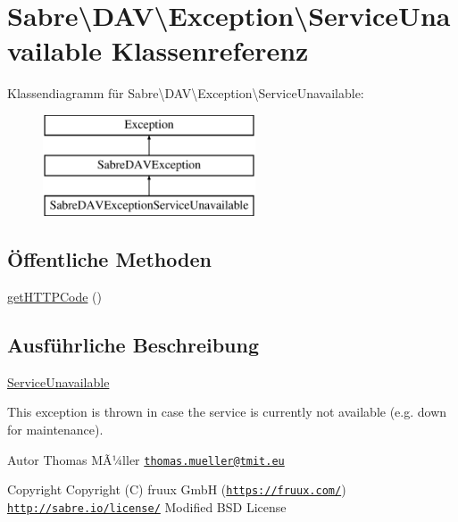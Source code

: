 \hypertarget{class_sabre_1_1_d_a_v_1_1_exception_1_1_service_unavailable}{}\section{Sabre\textbackslash{}D\+AV\textbackslash{}Exception\textbackslash{}Service\+Unavailable Klassenreferenz}
\label{class_sabre_1_1_d_a_v_1_1_exception_1_1_service_unavailable}
Klassendiagramm für Sabre\textbackslash{}D\+AV\textbackslash{}Exception\textbackslash{}Service\+Unavailable\+:\begin{figure}[H]
\begin{center}
\leavevmode
\includegraphics[height=3.000000cm]{class_sabre_1_1_d_a_v_1_1_exception_1_1_service_unavailable}
\end{center}
\end{figure}
\subsection*{Öffentliche Methoden}
\begin{DoxyCompactItemize}
\item 
\mbox{\hyperlink{class_sabre_1_1_d_a_v_1_1_exception_1_1_service_unavailable_ae8c3c16f888a0fec458229e94f56d614}{get\+H\+T\+T\+P\+Code}} ()
\end{DoxyCompactItemize}


\subsection{Ausführliche Beschreibung}
\mbox{\hyperlink{class_sabre_1_1_d_a_v_1_1_exception_1_1_service_unavailable}{Service\+Unavailable}}

This exception is thrown in case the service is currently not available (e.\+g. down for maintenance).

\begin{DoxyAuthor}{Autor}
Thomas MÃ¼ller \href{mailto:thomas.mueller@tmit.eu}{\tt thomas.\+mueller@tmit.\+eu} 
\end{DoxyAuthor}
\begin{DoxyCopyright}{Copyright}
Copyright (C) fruux GmbH (\href{https://fruux.com/}{\tt https\+://fruux.\+com/})  \href{http://sabre.io/license/}{\tt http\+://sabre.\+io/license/} Modified B\+SD License 
\end{DoxyCopyright}


